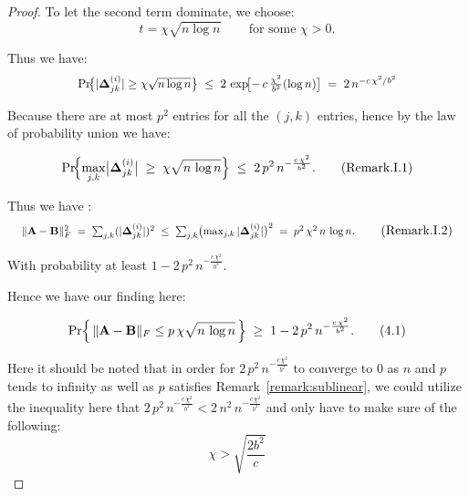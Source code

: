 \documentclass[11pt]{article}
\numberwithin{equation}{section}
\theoremstyle{plain}
\theoremstyle{definition}
\theoremstyle{remark}
\begin{document}
\begin{proof}
To let the second term dominate, we choose:
\[
  t = \chi\sqrt{n \log n}\, \qquad\text{for some }\chi>0.
\]

Thus we have:
\[
\scalebox{0.93}{$
\Pr\!\bigl\{|\mathbf{\Delta}_{jk}^{(i)}|\ge \chi\sqrt{n \log n}\bigr\}
\;\le\;
2\,\exp\!\bigl[-\,c\,\tfrac{\chi^2}{b^2}(\log n)\bigr]
\;=\;
2\,n^{-c\,\chi^2/b^2}
$}
\]

Because there are at most $p^{2}$ entries for all the $(j,k)$ entries, hence by the law of probability union we have:

\[
\Pr\!\Bigl\{\max_{j,k}\bigl|\mathbf{\Delta}_{jk}^{(i)}\bigr|\;\ge\;\chi\sqrt{n\,\log n}\Bigr\}
\;\le\;
2\,p^{2}\,n^{-\frac{c\,\chi^{2}}{b^{2}}}.\tag{Remark.I.1}\label{eq:Remark.I.1}
\]

Thus we have :
\[
\scalebox{0.85}{$
\|\mathbf{A} - \mathbf{B}\|_{F}^{2}
\;=\;
\sum_{j,k}(|\mathbf{\Delta}_{jk}^{(i)}|)^{2}
\;\le\;
\sum_{j,k}\bigl(\max_{j,k}|\mathbf{\Delta}_{jk}^{(i)}|\bigr)^{2}
\;=\;
p^{2}\,\chi^2\,n\,\log n
$}.\tag{Remark.I.2}\label{eq:Remark.I.2}
\]

With probability at least $1 - 2\,p^{2}\,n^{-\frac{c\,\chi^{2}}{b^{2}}}$.

Hence we have our finding here:

\[
\Pr\Bigl\{\,\|\mathbf{A} - \mathbf{B}\|_{F} \leq p\,\chi\sqrt{n\,\log n}\,\Bigr\}
\;\ge\;
1 - 2\,p^{2}\,n^{-\frac{c\,\chi^{2}}{b^{2}}}. \tag{4.1}\label{eq:4.1}
\]

Here it should be noted that in order for $2\,p^{2}\,n^{-\frac{c\,\chi^{2}}{b^{2}}}$ to converge to 0 as $n$ and $p$ tends to infinity as well as $p$ satisfies Remark~\ref{remark:sublinear},
we could utilize the inequality here that $2\,p^{2}\,n^{-\frac{c\,\chi^{2}}{b^{2}}} < 2\,n^{2}\,n^{-\frac{c\,\chi^{2}}{b^{2}}}$ and only have to make sure of the following:
\[
\chi > \sqrt{\frac{2 b^2}{c}}\tag{Remark.I.3}\label{eq:Remark.I.3}
\]

\end{proof}
\end{document}
